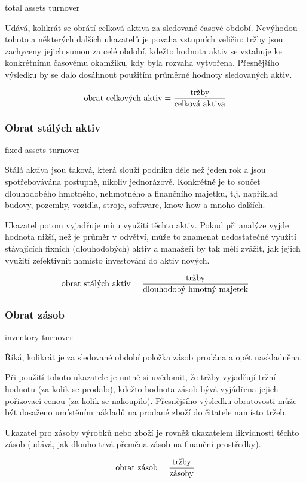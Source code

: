 total assets turnover

Udává, kolikrát se obrátí celková aktiva za sledované časové období. Nevýhodou tohoto a některých dalších ukazatelů je povaha vstupních veličin: tržby jsou zachyceny jejich sumou za celé období, kdežto hodnota aktiv se vztahuje ke konkrétnímu časovému okamžiku, kdy byla rozvaha vytvořena. Přesnějšího výsledku by se dalo dosáhnout použitím průměrné hodnoty sledovaných aktiv. 

$$\text{obrat celkových aktiv} = \dfrac{\text{tržby}}{\text{celková aktiva}}$$

\subsubsection{Obrat stálých aktiv}

fixed assets turnover

Stálá aktiva jsou taková, která slouží podniku déle než jeden rok a jsou spotřebovávána postupně, nikoliv jednorázově. Konkrétně je to součet dlouhodobého hmotného, nehmotného a finančního majetku, t.j. například budovy, pozemky, vozidla, stroje, software, know-how a mnoho dalších.

Ukazatel potom vyjadřuje míru využití těchto aktiv. Pokud při analýze vyjde hodnota nižší, než je průměr v odvětví, může to znamenat nedostatečné využití stávajících fixních (dlouhodobých) aktiv a manažeři by tak měli zvážit, jak jejich využití zefektivnit namísto investování do aktiv nových.

$$\text{obrat stálých aktiv} = \dfrac{\text{tržby}}{\text{dlouhodobý hmotný majetek}}$$

\subsubsection{Obrat zásob}

inventory turnover

Říká, kolikrát je za sledované období položka zásob prodána a opět naskladněna.

Při použití tohoto ukazatele je nutné si uvědomit, že tržby vyjadřují tržní hodnotu (za kolik se prodalo), kdežto hodnota zásob bývá vyjádřena jejich pořizovací cenou (za kolik se nakoupilo). Přesnějšího výsledku obratovosti může být dosaženo umístěním nákladů na prodané zboží do čitatele namísto tržeb.

Ukazatel pro zásoby výrobků nebo zboží je rovněž ukazatelem likvidnosti těchto zásob (udává, jak dlouho trvá přeměna zásob na finanční prostředky).

$$\text{obrat zásob} = \dfrac{\text{tržby}}{\text{zásoby}}$$



